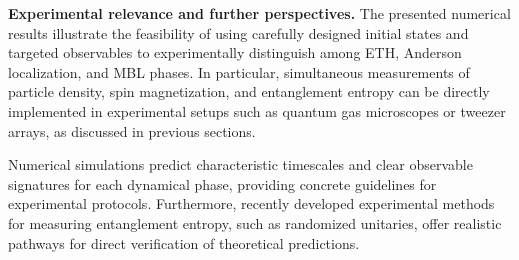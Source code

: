 


\textbf{Experimental relevance and further perspectives.}
The presented numerical results illustrate the feasibility of using carefully designed initial states and targeted observables to experimentally distinguish among ETH, Anderson localization, and MBL phases. In particular, simultaneous measurements of particle density, spin magnetization, and entanglement entropy can be directly implemented in experimental setups such as quantum gas microscopes or tweezer arrays, as discussed in previous sections.

Numerical simulations predict characteristic timescales and clear observable signatures for each dynamical phase, providing concrete guidelines for experimental protocols. Furthermore, recently developed experimental methods for measuring entanglement entropy, such as randomized unitaries, offer realistic pathways for direct verification of theoretical predictions.







